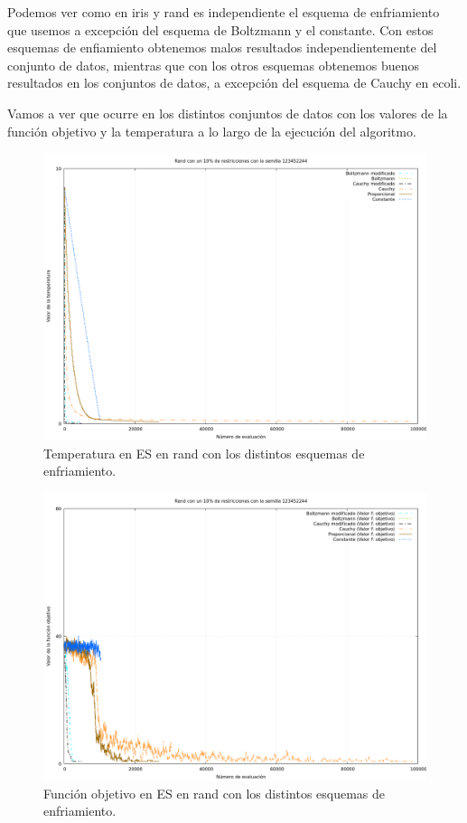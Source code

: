 \documentclass[12pt, spanish]{article}
\begin{document}
Podemos ver como en iris y rand es independiente el esquema de enfriamiento que usemos a excepción del esquema de Boltzmann y el constante. Con estos esquemas de enfiamiento obtenemos malos resultados independientemente del conjunto de datos, mientras que con los otros esquemas obtenemos buenos resultados en los conjuntos de datos, a excepción del esquema de Cauchy en ecoli.

Vamos a ver que ocurre en los distintos conjuntos de datos con los valores de la función objetivo y la temperatura a lo largo de la ejecución del algoritmo.


\begin{figure}[H]
	\centering
	\includegraphics[scale = 0.30]{cmp-tmp/rand-temp.png}
	
	\caption{Temperatura en ES en rand con los distintos esquemas de enfriamiento.}
	\label{fig:es-cmp2}
\end{figure}
\begin{figure}[H]
	\centering
	\includegraphics[scale = 0.30]{cmp-tmp/rand-es.png}
	
	\caption{Función objetivo en ES en rand con los distintos esquemas de enfriamiento.}
	\label{fig:es-cmp1}
\end{figure}
\end{document}
